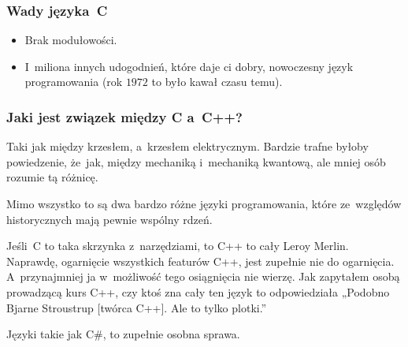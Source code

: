 \documentclass[10pt,t]{beamer}
\begin{document}
\begin{frame}
  \frametitle{Wady języka~C}


  \begin{itemize}

  \item Brak modułowości.

  \item I~miliona innych udogodnień, które daje ci dobry, nowoczesny język
    programowania (rok $1972$ to było kawał czasu temu).

  \end{itemize}

\end{frame}





\begin{frame}
  \frametitle{Jaki jest związek między C a~C++?}


  Taki jak między krzesłem, a~krzesłem elektrycznym. Bardzie trafne byłoby
  powiedzenie, że~jak, między mechaniką i~mechaniką kwantową, ale mniej
  osób rozumie tą różnicę.

  Mimo wszystko to są dwa bardzo różne języki programowania, które
  ze~względów historycznych mają pewnie wspólny rdzeń.

  Jeśli~C to taka skrzynka z~narzędziami, to C++ to cały Leroy
  Merlin. Naprawdę, ogarnięcie wszystkich featurów C++, jest zupełnie nie do
  ogarnięcia. A~przynajmniej ja w~możliwość tego osiągnięcia nie wierzę.
  Jak zapytałem osobą prowadzącą kurs C++, czy ktoś zna cały ten język
  to odpowiedziała „Podobno Bjarne Stroustrup [twórca C++]. Ale to tylko
  plotki.”

  Języki takie jak C\#, to zupełnie osobna sprawa.

\end{frame}















\end{document}
